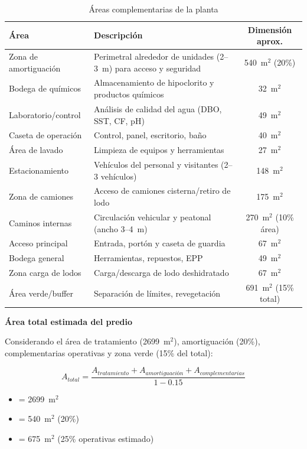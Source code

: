 \documentclass[12pt,a4paper]{article}
\begin{document}
\begin{table}[H]
\centering
\caption{Áreas complementarias de la planta}
\small
\begin{tabular}{lp{8cm}c}
\toprule
Área & Descripción & Dimensión aprox. \\
\midrule
Zona de amortiguación & Perimetral alrededor de unidades (2--3~m) para acceso y seguridad & 540~m$^2$ (20\%) \\
\addlinespace
Bodega de químicos & Almacenamiento de hipoclorito y productos químicos & 32~m$^2$ \\
\addlinespace
Laboratorio/control & Análisis de calidad del agua (DBO, SST, CF, pH) & 49~m$^2$ \\
\addlinespace
Caseta de operación & Control, panel, escritorio, baño & 40~m$^2$ \\
\addlinespace
Área de lavado & Limpieza de equipos y herramientas & 27~m$^2$ \\
\addlinespace
Estacionamiento & Vehículos del personal y visitantes (2--3 vehículos) & 148~m$^2$ \\
\addlinespace
Zona de camiones & Acceso de camiones cisterna/retiro de lodo & 175~m$^2$ \\
\addlinespace
Caminos internas & Circulación vehicular y peatonal (ancho 3--4~m) & 270~m$^2$ (10\% área) \\
\addlinespace
Acceso principal & Entrada, portón y caseta de guardia & 67~m$^2$ \\
\addlinespace
Bodega general & Herramientas, repuestos, EPP & 49~m$^2$ \\
\addlinespace
Zona carga de lodos & Carga/descarga de lodo deshidratado & 67~m$^2$ \\
\addlinespace
Área verde/buffer & Separación de límites, revegetación & 691~m$^2$ (15\% total) \\
\bottomrule
\end{tabular}
\end{table}

\textbf{Área total estimada del predio}

Considerando el área de tratamiento (2699~m$^2$), amortiguación (20\%), complementarias operativas y zona verde (15\% del total):

\begin{equation}
A_{total} = \frac{A_{tratamiento} + A_{amortiguación} + A_{complementarias}}{1 - 0.15}
\end{equation}

\begin{itemize}[noitemsep,leftmargin=2em]
    \item[$A_{tratamiento}$] = 2699~m$^2$
    \item[$A_{amortiguación}$] = 540~m$^2$ (20\%)
    \item[$A_{complementarias}$] = 675~m$^2$ (25\% operativas estimado)
\end{itemize}
\end{document}
